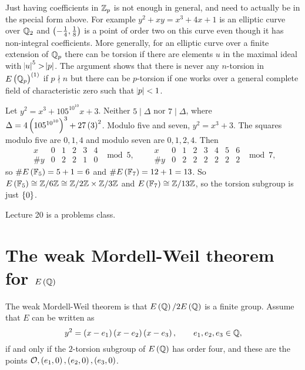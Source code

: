 \begin{remark}
Just having coefficients in $ \mathbb{Z}_p $ is not enough in general, and need to actually be in the special form above. For example $ y^2 + xy = x^3 + 4x + 1 $ is an elliptic curve over $ \mathbb{Q}_2 $ and $ \br{-\tfrac{1}{4}, \tfrac{1}{8}} $ is a point of order two on this curve even though it has non-integral coefficients. More generally, for an elliptic curve over a finite extension of $ \mathbb{Q}_p $ there can be torsion if there are elements $ u $ in the maximal ideal with $ \abs{u}^5 > \abs{p} $. The argument shows that there is never any $ n $-torsion in $ E\br{\QQ_p}^{\br{1}} $ if $ p \nmid n $ but there can be $ p $-torsion if one works over a general complete field of characteristic zero such that $ \abs{p} < 1 $.
\end{remark}

\begin{example}
Let $ y^2 = x^3 + 105^{10^{10}}x + 3 $. Neither $ 5 \mid \Delta $ nor $ 7 \mid \Delta $, where $ \Delta = 4\br{105^{10^{10}}}^3 + 27\br{3}^2 $. Modulo five and seven, $ y^2 = x^3 + 3 $. The squares modulo five are $ 0, 1, 4 $ and modulo seven are $ 0, 1, 2, 4 $. Then
$$
\begin{array}{c|c|c|c|c|c}
x & 0 & 1 & 2 & 3 & 4 \\
\hline
\#y & 0 & 2 & 2 & 1 & 0
\end{array}
\mod 5, \qquad
\begin{array}{c|c|c|c|c|c|c|c}
x & 0 & 1 & 2 & 3 & 4 & 5 & 6 \\
\hline
\#y & 0 & 2 & 2 & 2 & 2 & 2 & 2
\end{array}
\mod 7,
$$
so $ \#E\br{\FF_5} = 5 + 1 = 6 $ and $ \#E\br{\FF_7} = 12 + 1 = 13 $. So $ E\br{\FF_5} \cong \ZZ / 6\ZZ \cong \ZZ / 2\ZZ \times \ZZ / 3\ZZ $ and $ E\br{\FF_7} \cong \ZZ / 13\ZZ $, so the torsion subgroup is just $ \cbr{0} $.
\end{example}


Lecture 20 is a problems class.

\pagebreak

\section{The weak Mordell-Weil theorem for \texorpdfstring{$ E\br{\QQ} $}{E(Q)}}


The weak Mordell-Weil theorem is that $ E\br{\QQ} / 2E\br{\QQ} $ is a finite group. Assume that $ E $ can be written as
$$ y^2 = \br{x - e_1}\br{x - e_2}\br{x - e_3}, \qquad e_1, e_2, e_3 \in \QQ, $$
if and only if the $ 2 $-torsion subgroup of $ E\br{\QQ} $ has order four, and these are the points $ \OOO, \br{e_1, 0}, \br{e_2, 0}, \br{e_3, 0} $.

